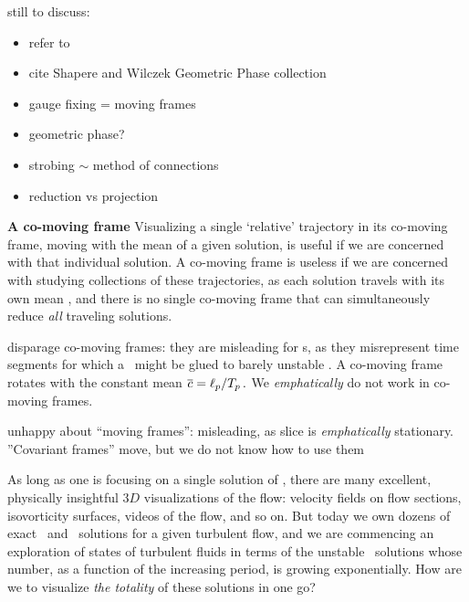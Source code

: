 \documentclass[aip,cha,reprint,
secnumarabic,
nofootinbib, tightenlines,
nobibnotes, showkeys, showpacs,
groupedaddress
]{revtex4-1}
\begin{document}
still to discuss:
    \begin{itemize}
      \item refer to 
      \item cite Shapere and Wilczek Geometric Phase collection

      \item gauge fixing = moving frames

      \item geometric phase?

  \item strobing $\sim$ method of connections

  \item reduction vs projection
    \end{itemize}


{\bf A co-moving frame}
Visualizing a single `relative' trajectory in its co-moving frame, moving with
the mean {\phaseVel} of a given solution, is useful if we are
concerned with that individual solution.
A co-moving frame is useless if
we are concerned with studying collections of these trajectories, as each
solution travels with its own mean {\phaseVel}, and there is no single
co-moving frame that can simultaneously reduce \emph{all} traveling
solutions.

disparage co-moving frames: they are misleading for \rpo s, as they
    misrepresent time segments for which a \po\ might be glued to
    barely unstable \eqv. A co-moving frame rotates with the constant
    mean
    $\overline{c}= \ell_p/{T_{p}}
    \,.
    $ We \emph{emphatically} do not work in
    co-moving frames.

unhappy about ``moving frames'': misleading, as slice is
     \emph{emphatically} stationary. ''Covariant frames'' move, but we
     do not know how to use them

    As long as one is focusing on a single solution of \NSe, there are many
    excellent, physically insightful $3D$ visualizations of the flow:
    velocity fields on flow sections, isovorticity surfaces, videos of the
    flow, and so on. But today we own dozens of exact \eqv\ and \reqv\
    solutions for a given turbulent flow, and we are commencing an exploration of
    states of turbulent fluids in terms of the unstable \po\ solutions whose
    number, as a function of the increasing period, is growing exponentially.
    How are we to visualize \emph{the totality} of these solutions in one go?
\end{document}
